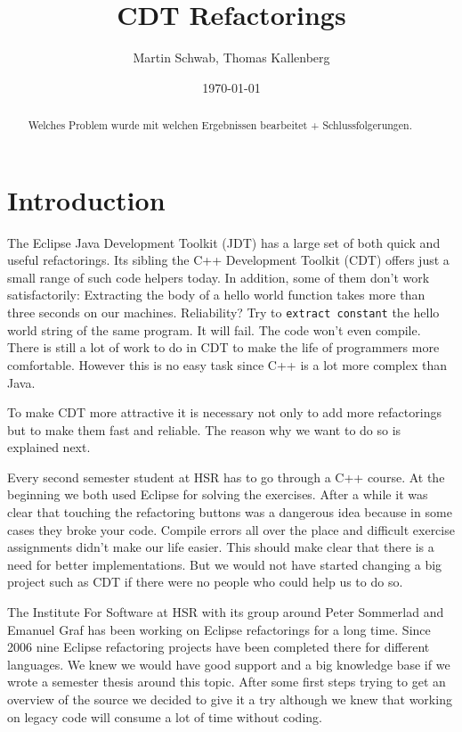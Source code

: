 \documentclass[a4paper,10pt,abstract=on]{scrreprt}
\title{CDT Refactorings}
\date{\today}
\author{Martin Schwab, Thomas Kallenberg}
\begin{document}
\maketitle
{}

\begin{abstract}
Welches Problem wurde mit welchen Ergebnissen bearbeitet + Schlussfolgerungen.
\end{abstract}

\tableofcontents
{}

\chapter{Introduction}
The Eclipse Java Development Toolkit (JDT) has a large set of both quick and useful refactorings. Its sibling the C++ Development Toolkit (CDT) offers just a small range of such code helpers today. In addition, some of them don't work satisfactorily: Extracting the body of a hello world function takes more than three seconds on our machines. Reliability? Try to \texttt{extract constant} the hello world string of the same program. It will fail. The code won't even compile. There is still a lot of work to do in CDT to make the life of programmers more comfortable. However this is no easy task since C++ is a lot more complex than Java.

To make CDT more attractive it is necessary not only to add more refactorings but to make them fast and reliable. The reason why we want to do so is explained next.

Every  second semester student at HSR has to go through a C++ course. At the beginning we both used Eclipse for solving the exercises. After a while it was clear that touching the refactoring buttons was a dangerous idea because in some cases they broke your code. Compile errors all over the place and difficult exercise assignments didn't make our life easier. This should make clear that there is a need for better implementations. But we would not have started changing a big project such as CDT if there were no people who could help us to do so.

The  Institute For Software at HSR with its group around Peter Sommerlad and Emanuel Graf has been working on Eclipse refactorings for a long time. Since 2006 nine Eclipse refactoring projects have been completed there for different languages. We knew we would have good support and a big knowledge base if we wrote a semester thesis around this topic. After some first steps trying to get an overview of the source we decided to give it a try although we knew that working on legacy code will consume a lot of time without coding.
\end{document}
